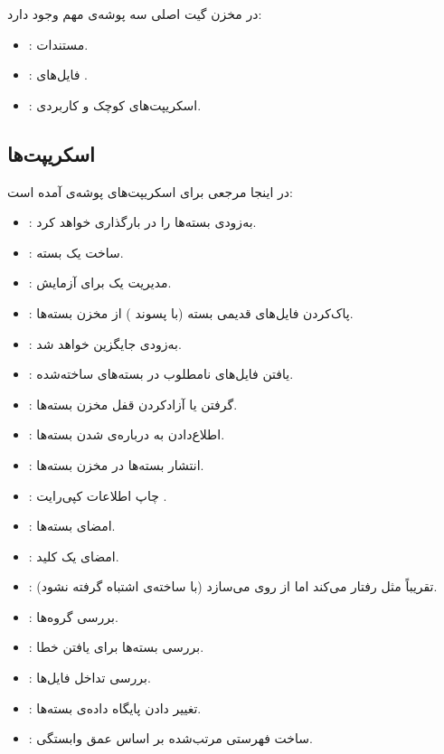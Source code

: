 \documentclass[a4paper, oneside, 11pt]{book}
\begin{document}
در مخزن گیت اصلی سه پوشه‌ی مهم وجود دارد:

\begin{itemize}
\item {}: مستندات.
\item {}: فایل‌های .
\item {}: اسکریپت‌های کوچک و کاربردی.
\end{itemize}

\subsection{اسکریپت‌ها}
در اینجا مرجعی برای اسکریپت‌های پوشه‌ی  آمده است:

\begin{itemize}
\item {}: به‌زودی بسته‌ها را در  بارگذاری خواهد کرد.
\item {}: ساخت یک بسته.
\item {}: مدیریت یک  برای آزمایش.
\item {}: پاک‌کردن فایل‌های قدیمی بسته (با پسوند ) از مخزن بسته‌ها.
\item {}: به‌زودی جایگزین  خواهد شد.
\item {}: یافتن فایل‌های نامطلوب در بسته‌های ساخته‌شده.
\item {}: گرفتن یا آزادکردن قفل مخزن بسته‌ها.
\item {}: اطلاع‌دادن به  درباره‌ی  شدن بسته‌ها.
\item {}: انتشار بسته‌ها در مخزن بسته‌ها.
\item {}: چاپ اطلاعات کپی‌رایت .
\item {}: امضای بسته‌ها.
\item {}: امضای یک کلید.
\item {}: تقریباً مثل  رفتار می‌کند اما از روی  می‌سازد
    (با  ساخته‌ی  اشتباه گرفته نشود).
\item {}: بررسی گروه‌ها.
\item {}: بررسی بسته‌ها برای یافتن خطا.
\item {}: بررسی تداخل فایل‌ها.
\item {}: تغییر دادن پایگاه داده‌ی بسته‌ها.
\item {}: ساخت فهرستی مرتب‌شده بر اساس عمق وابستگی.

\end{itemize}
\end{document}
